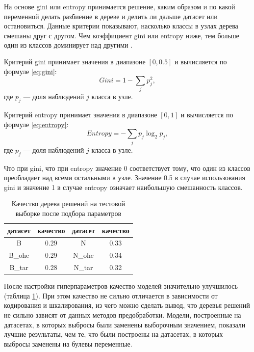 \documentclass[14pt]{mmcs_article}
\begin{document}
На основе gini или entropy принимается решение, каким образом и по какой переменной делать разбиение в дереве и делить ли дальше датасет или остановиться. Данные критерии показывают, насколько классы в узлах дерева смешаны друг с другом. Чем коэффициент gini или entropy ниже, тем больше один из классов доминирует над другими \cite{lib:ginientropy}.

Критерий gini принимает значения в диапазоне $[0, 0.5]$ и вычисляется по формуле \ref{eq:gini}:
\begin{equation}\label{eq:gini}
	Gini = 1 - \sum_j p_j^2,
\end{equation}
где $p_j$ --- доля наблюдений $j$ класса в узле.

Критерий entropy принимает значения в диапазоне $[0, 1]$ и вычисляется по формуле \ref{eq:entropy}:
\begin{equation}\label{eq:entropy}
	Entropy = - \sum_j p_j \log_2 p_j,
\end{equation}
где $p_j$ --- доля наблюдений $j$ класса в узле.

Что при gini, что при entropy значение 0 соответствует тому, что один из классов преобладает над всеми остальными в узле. Значение 0.5 в случае использования gini и значение 1 в случае entropy означает наибольшую смешанность классов.


\begin{table}[H]
	\centering
	\caption{Качество дерева решений на тестовой выборке после подбора параметров}\label{models:table2}
	\begin{tabular}{cccc}
		\hline
		датасет & качество	& датасет & качество \\
		\hline
		B &	0.29 &	N &	0.33 \\
		B\_ohe & 0.29 &	N\_ohe & 0.34\\
		B\_tar & 0.28 & N\_tar & 0.32 \\
		\hline
	\end{tabular}
\end{table}

После настройки гиперпараметров качество моделей значительно улучшилось (таблица \ref{models:table2}). При этом качество не сильно отличается в зависимости от кодирования и шкалирования, из чего можно сделать вывод, что деревья решений не сильно зависят от данных методов предобработки. Модели, построенные на датасетах, в которых выбросы были заменены выборочным значением, показали лучшие результаты, чем те, что были построены на датасетах, в которых выбросы заменены на булевы переменные. 
\end{document}
